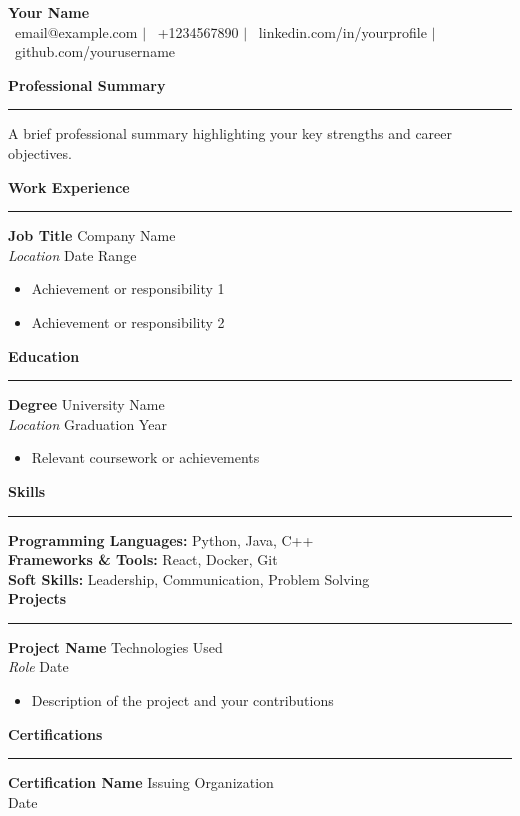 \documentclass[11pt,a4paper]{article}
\newcommand{\section}[1]{\large\textbf{#1}\medskip\hrule\bigskip}
\newcommand{\entry}[4]{
    {\textbf{#1}} \hfill {#2}\\
    {\textit{#3}} \hfill {#4}\\
}
\newcommand{\skill}[2]{{\textbf{#1:}} #2 \\}
\begin{document}
\begin{center}
    {\Huge \textbf{Your Name}}\\[0.3cm]
    \faEnvelope\ email@example.com $|$
    \faPhone\ +1234567890 $|$
    \faLinkedin\ linkedin.com/in/yourprofile $|$
    \faGithub\ github.com/yourusername
\end{center}

\section{Professional Summary}
A brief professional summary highlighting your key strengths and career objectives.

\section{Work Experience}
\entry{Job Title}{Company Name}{Location}{Date Range}
\begin{itemize}
    \item Achievement or responsibility 1
    \item Achievement or responsibility 2
\end{itemize}

\section{Education}
\entry{Degree}{University Name}{Location}{Graduation Year}
\begin{itemize}
    \item Relevant coursework or achievements
\end{itemize}

\section{Skills}
\skill{Programming Languages}{Python, Java, C++}
\skill{Frameworks \& Tools}{React, Docker, Git}
\skill{Soft Skills}{Leadership, Communication, Problem Solving}

\section{Projects}
\entry{Project Name}{Technologies Used}{Role}{Date}
\begin{itemize}
    \item Description of the project and your contributions
\end{itemize}

\section{Certifications}
\entry{Certification Name}{Issuing Organization}{}{Date}
\end{document}
